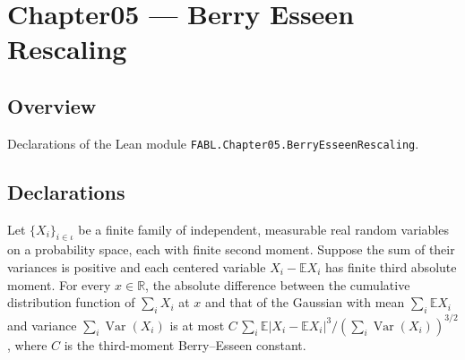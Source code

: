 \chapter{Chapter05 — Berry Esseen Rescaling}
\section{Overview}

Declarations of the Lean module \texttt{FABL.Chapter05.BerryEsseenRescaling}.

\section{Declarations}

\begin{theorem}
\label{FABL.exercise5_17}
\leanok
{}
Let $\{X_i\}_{i\in\iota}$ be a finite family of independent, measurable real random
variables on a probability space, each with finite second moment. Suppose the sum of
their variances is positive and each centered variable $X_i-\mathbb{E}X_i$ has finite
third absolute moment. For every $x\in\mathbb{R}$, the absolute difference between the
cumulative distribution function of $\sum_i X_i$ at $x$ and that of the Gaussian with
mean $\sum_i\mathbb{E}X_i$ and variance $\sum_i\operatorname{Var}(X_i)$ is at most
$C\,\sum_i\mathbb{E}|X_i-\mathbb{E}X_i|^3/(\sum_i\operatorname{Var}(X_i))^{3/2}$, where
$C$ is the third-moment Berry–Esseen constant.
\end{theorem}
